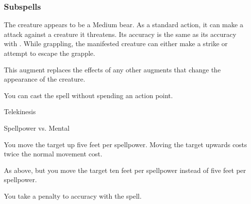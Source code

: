 \subsubsection{Subspells}



The creature appears to be a Medium bear.
As a standard action, it can make a  attack against a creature it threatens.
Its accuracy is the same as its accuracy with .
While grappling, the manifested creature can either make a strike or attempt to escape the grapple.

This augment replaces the effects of any other augments that change the appearance of the creature.






You can cast the spell without spending an action point.




\newpage
\begin{spellsection}{Telekinesis}

\begin{spellcontent}

\begin{spelltargetinginfo}




\end{spelltargetinginfo}


\begin{spelleffects}




\begin{spellattack}{Spellpower vs. Mental}


\hit
You move the target up five feet per spellpower. Moving the target upwards costs twice the normal movement cost.



\crit
As above, but you move the target ten feet per spellpower instead of five feet per spellpower.



\end{spellattack}





\end{spelleffects}

\end{spellcontent}
\begin{spellfooter}


\end{spellfooter}
\begin{spellsubcontent}


\begin{spellcantrip}
You take a  penalty to accuracy with the spell.
\end{spellcantrip}


\end{spellsubcontent}
\end{spellsection}


